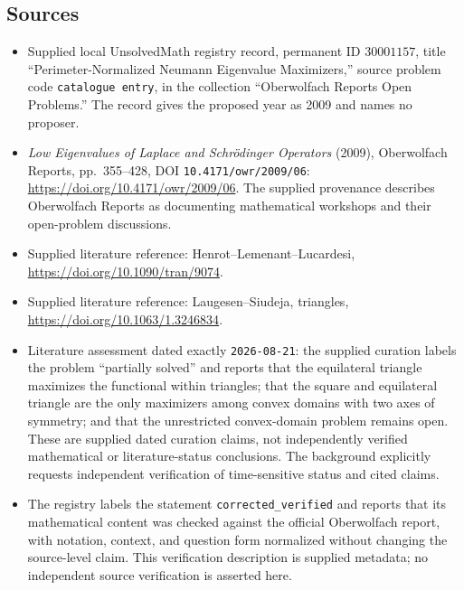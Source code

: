 \documentclass[11pt]{article}
\begin{document}
\subsection{Sources}
\begin{itemize}
\item Supplied local UnsolvedMath registry record, permanent ID \(30001157\), title ``Perimeter-Normalized Neumann Eigenvalue Maximizers,'' source problem code \texttt{catalogue entry}, in the collection ``Oberwolfach Reports Open Problems.'' The record gives the proposed year as 2009 and names no proposer.
\item \emph{Low Eigenvalues of Laplace and Schrödinger Operators} (2009), Oberwolfach Reports, pp.\ 355--428, DOI \texttt{10.4171/owr/2009/06}: \url{https://doi.org/10.4171/owr/2009/06}. The supplied provenance describes Oberwolfach Reports as documenting mathematical workshops and their open-problem discussions.
\item Supplied literature reference: Henrot--Lemenant--Lucardesi, \url{https://doi.org/10.1090/tran/9074}.
\item Supplied literature reference: Laugesen--Siudeja, triangles, \url{https://doi.org/10.1063/1.3246834}.
\item Literature assessment dated exactly \texttt{2026-08-21}: the supplied curation labels the problem ``partially solved'' and reports that the equilateral triangle maximizes the functional within triangles; that the square and equilateral triangle are the only maximizers among convex domains with two axes of symmetry; and that the unrestricted convex-domain problem remains open. These are supplied dated curation claims, not independently verified mathematical or literature-status conclusions. The background explicitly requests independent verification of time-sensitive status and cited claims.
\item The registry labels the statement \texttt{corrected\_verified} and reports that its mathematical content was checked against the official Oberwolfach report, with notation, context, and question form normalized without changing the source-level claim. This verification description is supplied metadata; no independent source verification is asserted here.
\end{itemize}
\end{document}
